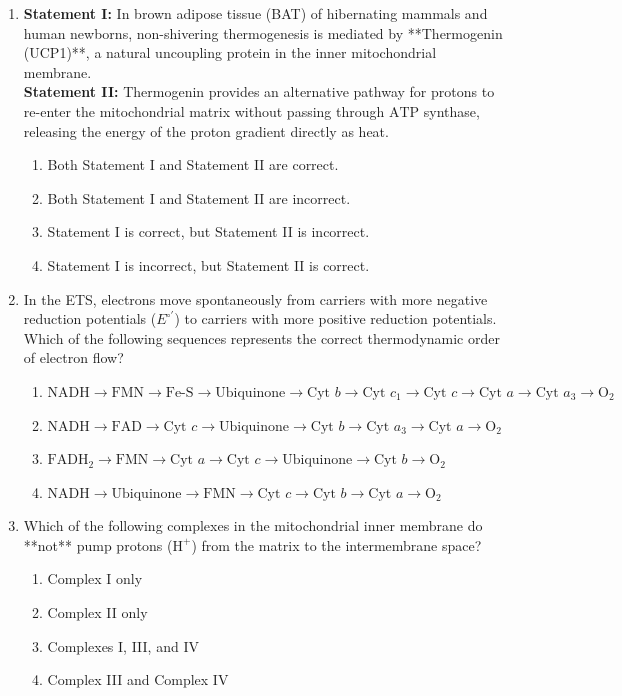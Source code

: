 \documentclass[11pt, a4paper]{article}
\begin{document}
\begin{enumerate}[label=\textbf{\arabic*.}]
\item \textbf{Statement I:} In brown adipose tissue (BAT) of hibernating mammals and human newborns, non-shivering thermogenesis is mediated by **Thermogenin (UCP1)**, a natural uncoupling protein in the inner mitochondrial membrane. \\
\textbf{Statement II:} Thermogenin provides an alternative pathway for protons to re-enter the mitochondrial matrix without passing through $\text{ATP}$ synthase, releasing the energy of the proton gradient directly as heat.
\begin{enumerate}[label=(\Alph*)]
    \item Both Statement I and Statement II are correct.
    \item Both Statement I and Statement II are incorrect.
    \item Statement I is correct, but Statement II is incorrect.
    \item Statement I is incorrect, but Statement II is correct.
\end{enumerate}

\item In the ETS, electrons move spontaneously from carriers with more negative reduction potentials ($E^{\circ\prime}$) to carriers with more positive reduction potentials. Which of the following sequences represents the correct thermodynamic order of electron flow?
\begin{enumerate}[label=(\Alph*)]
    \item $\text{NADH} \rightarrow \text{FMN} \rightarrow \text{Fe-S} \rightarrow \text{Ubiquinone} \rightarrow \text{Cyt } b \rightarrow \text{Cyt } c_1 \rightarrow \text{Cyt } c \rightarrow \text{Cyt } a \rightarrow \text{Cyt } a_3 \rightarrow \text{O}_2$
    \item $\text{NADH} \rightarrow \text{FAD} \rightarrow \text{Cyt } c \rightarrow \text{Ubiquinone} \rightarrow \text{Cyt } b \rightarrow \text{Cyt } a_3 \rightarrow \text{Cyt } a \rightarrow \text{O}_2$
    \item $\text{FADH}_2 \rightarrow \text{FMN} \rightarrow \text{Cyt } a \rightarrow \text{Cyt } c \rightarrow \text{Ubiquinone} \rightarrow \text{Cyt } b \rightarrow \text{O}_2$
    \item $\text{NADH} \rightarrow \text{Ubiquinone} \rightarrow \text{FMN} \rightarrow \text{Cyt } c \rightarrow \text{Cyt } b \rightarrow \text{Cyt } a \rightarrow \text{O}_2$
\end{enumerate}

\item Which of the following complexes in the mitochondrial inner membrane do **not** pump protons ($\text{H}^+$) from the matrix to the intermembrane space?
\begin{enumerate}[label=(\Alph*)]
    \item Complex I only
    \item Complex II only
    \item Complexes I, III, and IV
    \item Complex III and Complex IV
\end{enumerate}


\end{enumerate}
\end{document}
